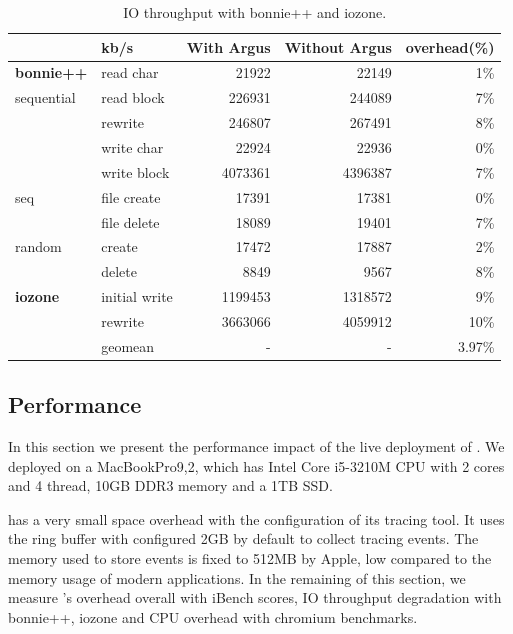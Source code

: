\begin{table}[tb]
\footnotesize
\centering
\begin{tabular}{ll|rrr}
\hline
 & kb/s & With Argus & Without Argus & overhead(\%)\\
 \hline\hline
\textbf{bonnie++}&read char & 21922 & 22149 & 1\%\\
 sequential& read block & 226931 & 244089 & 7\%\\
 & rewrite & 246807 & 267491 & 8\%\\
 & write char & 22924 & 22936 & 0\%\\
 & write block & 4073361 & 4396387 & 7\%\\
 \hline
 seq& file create & 17391 & 17381 & 0\%\\
 & file delete & 18089 & 19401 & 7\%\\
 \hline
 random& create & 17472 & 17887 & 2\%\\
 & delete & 8849 & 9567 & 8\%\\
 \hline
 \hline
\textbf{iozone} & initial write & 1199453 & 1318572 & 9\%\\
 & rewrite & 3663066 & 4059912 & 10\%\\
 \hline
 & geomean & - & - & 3.97\%\\
\hline
\end{tabular}
\caption{IO throughput with bonnie++ and iozone.}
\label{tab:iothroughput}
\vspace{-0.5cm}
\end{table}


\subsection{Performance} \label{sec:evaluation}

In this section we present the performance impact of the live deployment of
\xxx. We deployed \xxx on a MacBookPro9,2, which has Intel Core i5-3210M CPU with
2 cores and 4 thread, 10GB DDR3 memory and a 1TB SSD.

\xxx has a very small space overhead with the configuration of its tracing
tool. It uses the ring buffer with configured 2GB by default to collect tracing
events. The memory used to store events is fixed to 512MB by Apple, 
low compared to the memory usage of modern applications. In the remaining
of this section, we measure \xxx's overhead overall with iBench scores, IO
throughput degradation with bonnie++, iozone and CPU overhead with chromium
benchmarks.


